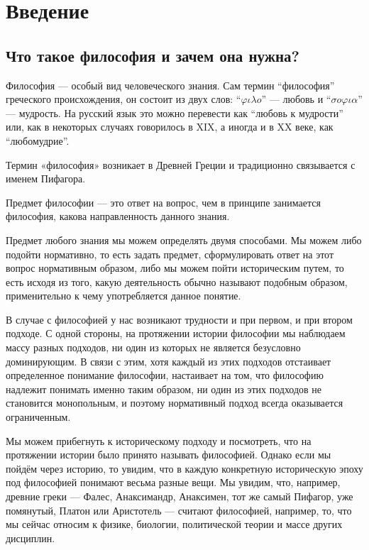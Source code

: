 \documentclass[oneside,final,14pt]{extreport}
\begin{document}
\tableofcontents

\chapter{Введение}
\section{Что такое философия и зачем она нужна?}
Философия — особый вид человеческого знания. Сам термин “философия” греческого
происхождения, он состоит из двух слов: “$\varphi \iota \lambda o$” — любовь и 
“$\sigma o \varphi \iota \alpha$” — мудрость. 
На русский язык это можно перевести как “любовь к мудрости” или, как в некоторых 
случаях говорилось в XIX, а иногда и в XX веке, как “любомудрие”.

Термин «философия» возникает в Древней Греции и традиционно связывается с именем 
Пифагора.

Предмет философии — это ответ на вопрос, чем в принципе занимается философия, 
какова направленность данного знания.

Предмет любого знания мы можем определять двумя способами. Мы можем либо подойти 
нормативно, то есть задать предмет, сформулировать ответ на этот вопрос нормативным
образом, либо мы можем пойти историческим путем, то есть исходя из того, какую 
деятельность обычно называют подобным образом, применительно к чему употребляется 
данное понятие.

В случае с философией у нас возникают трудности и при первом, и при втором подходе. С одной стороны, на протяжении истории философии мы наблюдаем массу разных подходов, ни один из которых не является безусловно доминирующим. В связи с этим, хотя каждый из этих подходов отстаивает определенное понимание философии, настаивает на том, что философию надлежит понимать именно таким образом, ни один из этих подходов не становится монопольным, и поэтому нормативный подход всегда оказывается ограниченным.

Мы можем прибегнуть к историческому подходу и посмотреть, что на протяжении истории было принято называть философией. Однако если мы пойдём через историю, то увидим, что в каждую конкретную историческую эпоху под философией понимают весьма разные вещи. Мы увидим, что, например, древние греки — Фалес, Анаксимандр, Анаксимен, тот же самый Пифагор, уже помянутый, Платон или Аристотель — считают философией, например, то, что мы сейчас относим к физике, биологии, политической теории и массе других дисциплин.
\end{document}
